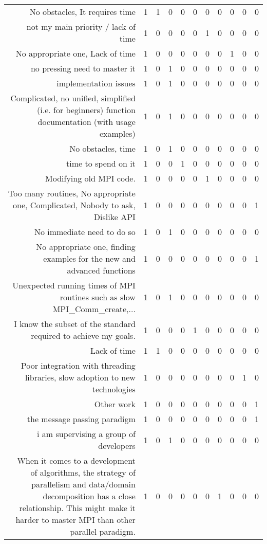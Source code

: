 {\begin{landscape}
\begin{longtable}[htb]{r|c|c|c|c|c|c|c|c|c|c}
{No obstacles, It requires time} & 1 & 1 & 0 & 0 & 0 & 0 & 0 & 0 & 0 & 0 \\%
{not my main priority / lack of time} & 1 & 0 & 0 & 0 & 0 & 1 & 0 & 0 & 0 & 0 \\%
{No appropriate one, Lack of time} & 1 & 0 & 0 & 0 & 0 & 0 & 0 & 1 & 0 & 0 \\%
{no pressing need to master it} & 1 & 0 & 1 & 0 & 0 & 0 & 0 & 0 & 0 & 0 \\%
{implementation issues} & 1 & 0 & 1 & 0 & 0 & 0 & 0 & 0 & 0 & 0 \\%
{Complicated, no unified, simplified (i.e. for beginners) function documentation (with usage examples)} & 1 & 0 & 1 & 0 & 0 & 0 & 0 & 0 & 0 & 0 \\%
{No obstacles, time} & 1 & 0 & 1 & 0 & 0 & 0 & 0 & 0 & 0 & 0 \\%
{time to spend on it} & 1 & 0 & 0 & 1 & 0 & 0 & 0 & 0 & 0 & 0 \\%
{Modifying old MPI code.} & 1 & 0 & 0 & 0 & 0 & 1 & 0 & 0 & 0 & 0 \\%
{Too many routines, No appropriate one, Complicated, Nobody to ask, Dislike API} & 1 & 0 & 0 & 0 & 0 & 0 & 0 & 0 & 0 & 1 \\%
{No immediate need to do so} & 1 & 0 & 1 & 0 & 0 & 0 & 0 & 0 & 0 & 0 \\%
{No appropriate one, finding examples for the new and advanced functions} & 1 & 0 & 0 & 0 & 0 & 0 & 0 & 0 & 0 & 1 \\%
{Unexpected running times of MPI routines such as slow MPI\_Comm\_create,...} & 1 & 0 & 1 & 0 & 0 & 0 & 0 & 0 & 0 & 0 \\%
{I know the subset of the standard required to achieve my goals.} & 1 & 0 & 0 & 0 & 1 & 0 & 0 & 0 & 0 & 0 \\%
{Lack of time} & 1 & 1 & 0 & 0 & 0 & 0 & 0 & 0 & 0 & 0 \\%
{Poor integration with threading libraries, slow adoption to new technologies} & 1 & 0 & 0 & 0 & 0 & 0 & 0 & 0 & 1 & 0 \\%
{Other work} & 1 & 0 & 0 & 0 & 0 & 0 & 0 & 0 & 0 & 1 \\%
{the message passing paradigm} & 1 & 0 & 0 & 0 & 0 & 0 & 0 & 0 & 0 & 1 \\%
{i am supervising a group of developers} & 1 & 0 & 1 & 0 & 0 & 0 & 0 & 0 & 0 & 0 \\%
{When it comes to a development of algorithms, the strategy of parallelism and  data/domain decomposition has a close relationship. This might make it harder to master MPI than other parallel paradigm.} & 1 & 0 & 0 & 0 & 0 & 0 & 1 & 0 & 0 & 0 \\%

\end{longtable}
\end{landscape}}
